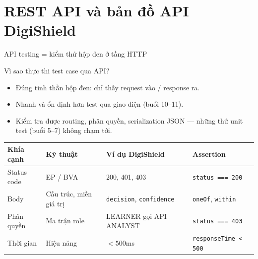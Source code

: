 \documentclass[aspectratio=169,12pt]{beamer}
\begin{document}
\section{REST API và bản đồ API DigiShield}

\begin{frame}{API testing = kiểm thử hộp đen ở tầng HTTP}
  \begin{block}{Vì sao thực thi test case qua API?}
    \begin{itemize}
      \item Đúng tinh thần hộp đen: chỉ thấy request vào / response ra.
      \item Nhanh và ổn định hơn test qua giao diện (buổi 10--11).
      \item Kiểm tra được routing, phân quyền, serialization JSON ---
        những thứ unit test (buổi 5--7) không chạm tới.
    \end{itemize}
  \end{block}

  \begin{center}
  \scriptsize
  \setlength{\tabcolsep}{4pt}
  \begin{tabular}{p{2.4cm}p{2.2cm}p{3.4cm}p{3.6cm}}
    \toprule
    \textbf{Khía cạnh} & \textbf{Kỹ thuật} & \textbf{Ví dụ DigiShield} & \textbf{Assertion} \\
    \midrule
    Status code & EP / BVA & 200, 401, 403 & \texttt{status === 200} \\
    Body & Cấu trúc, miền giá trị & \texttt{decision}, \texttt{confidence} & \texttt{oneOf}, \texttt{within} \\
    Phân quyền & Ma trận role & LEARNER gọi API ANALYST & \texttt{status === 403} \\
    Thời gian & Hiệu năng & $< 500$ms & \texttt{responseTime < 500} \\
    \bottomrule
  \end{tabular}
  \end{center}
\end{frame}
\end{document}
